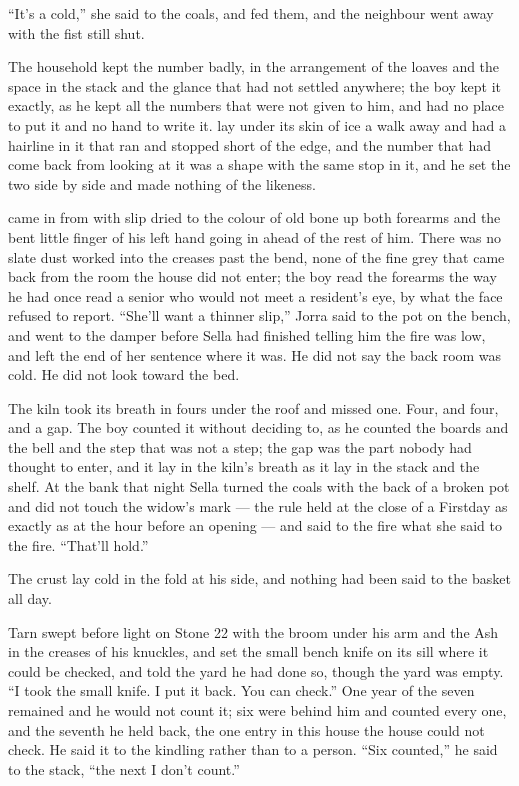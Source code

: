 “It's a cold,” she said to the coals, and fed them, and the neighbour went away with the fist still shut.

The household kept the number badly, in the arrangement of the loaves and the space in the stack and the glance that had not settled anywhere; the boy kept it exactly, as he kept all the numbers that were not given to him, and had no place to put it and no hand to write it.  lay under its skin of ice a walk away and had a hairline in it that ran and stopped short of the edge, and the number that had come back from looking at it was a shape with the same stop in it, and he set the two side by side and made nothing of the likeness.

 came in from  with slip dried to the colour of old bone up both forearms and the bent little finger of his left hand going in ahead of the rest of him. There was no slate dust worked into the creases past the bend, none of the fine grey that came back from the room the house did not enter; the boy read the forearms the way he had once read a senior who would not meet a resident's eye, by what the face refused to report. “She'll want a thinner slip,” Jorra said to the pot on the bench, and went to the damper before Sella had finished telling him the fire was low, and left the end of her sentence where it was. He did not say the back room was cold. He did not look toward the bed.

The kiln took its breath in fours under the roof and missed one. Four, and four, and a gap. The boy counted it without deciding to, as he counted the boards and the bell and the step that was not a step; the gap was the part nobody had thought to enter, and it lay in the kiln's breath as it lay in the stack and the shelf. At the bank that night Sella turned the coals with the back of a broken pot and did not touch the widow's mark --- the rule held at the close of a Firstday as exactly as at the hour before an opening --- and said to the fire what she said to the fire. “That'll hold.”

The crust lay cold in the fold at his side, and nothing had been said to the basket all day.

\scenebreak


Tarn swept before light on Stone 22 with the broom under his arm and the Ash in the creases of his knuckles, and set the small bench knife on its sill where it could be checked, and told the yard he had done so, though the yard was empty. “I took the small knife. I put it back. You can check.” One year of the seven remained and he would not count it; six were behind him and counted every one, and the seventh he held back, the one entry in this house the house could not check. He said it to the kindling rather than to a person. “Six counted,” he said to the stack, “the next I don't count.”

